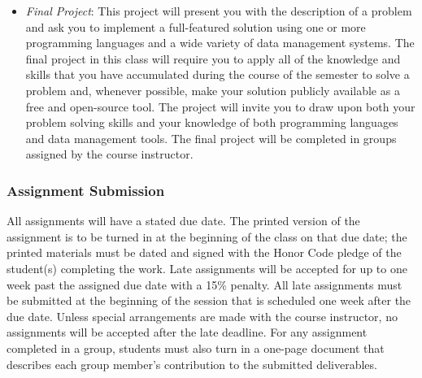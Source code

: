 \begin{itemize}

  \item {\em Final Project}: This project will present you with the description of a problem and ask you to implement
    a full-featured solution using one or more programming languages and a wide variety of data management systems.
    The final project in this class will require you to apply all of the knowledge and skills that you have
    accumulated during the course of the semester to solve a problem and, whenever possible, make your solution
    publicly available as a free and open-source tool.  The project will invite you to draw upon both your problem
    solving skills and your knowledge of both programming languages and data management tools. The final project will
    be completed in groups assigned by the course instructor.

\end{itemize}

\subsubsection*{Assignment Submission}

All assignments will have a stated due date. The printed version of the assignment is to be turned in at the beginning
of the class on that due date; the printed materials must be dated and signed with the Honor Code pledge of the
student(s) completing the work.  Late assignments will be accepted for up to one week past the assigned due date with a
15\% penalty. All late assignments must be submitted at the beginning of the session that is scheduled one week after
the due date. Unless special arrangements are made with the course instructor, no assignments will be accepted after the
late deadline. For any assignment completed in a group, students must also turn in a one-page document that describes
each group member's contribution to the submitted deliverables.  


